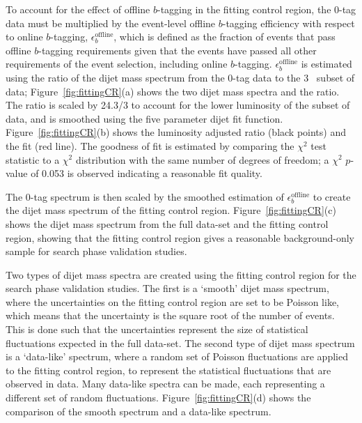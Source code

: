 To account for the effect of offline $b$-tagging in the fitting control region,
the 0-tag data must be multiplied by the event-level offline $b$-tagging efficiency with respect to online $b$-tagging, $\epsilon_b^{\text{offline}}$,
which is defined as the fraction of events that pass offline $b$-tagging requirements given
that the events have passed all other requirements of the \lm{} event selection, including online $b$-tagging.
$\epsilon_b^{\text{offline}}$ is estimated using the ratio
of the dijet mass spectrum from the 0-tag data to the 3~\ifb{} subset of data;
Figure~\ref{fig:fittingCR}(a) shows the two dijet mass spectra and the ratio.
The ratio is scaled by 24.3/3 to account for the lower luminosity of the subset of data,
and is smoothed using the five parameter dijet fit function.
Figure~\ref{fig:fittingCR}(b) shows the luminosity adjusted ratio (black points) and the fit (red line).
The goodness of fit is estimated by comparing the $\chi^2$ test statistic to a $\chi^2$ distribution with the same number of degrees of freedom;
a $\chi^2$ $p$-value of 0.053 is observed indicating a reasonable fit quality.

The 0-tag spectrum is then scaled by the smoothed estimation of $\epsilon_b^{\text{offline}}$ to create the dijet mass spectrum of the fitting control region.
Figure~\ref{fig:fittingCR}(c) shows the dijet mass spectrum from the full \lm{} data-set and the fitting control region,
showing that the fitting control region gives a reasonable background-only sample for search phase validation studies.

Two types of dijet mass spectra are created using the fitting control region for the search phase validation studies.
The first is a `smooth' dijet mass spectrum, where the uncertainties on the fitting control region are set to be Poisson like,
which means that the uncertainty is the square root of the number of events.
This is done such that the uncertainties represent the size of statistical fluctuations expected in the full \lm{} data-set.
The second type of dijet mass spectrum is a `data-like' spectrum,
where a random set of Poisson fluctuations are applied to the fitting control region,
to represent the statistical fluctuations that are observed in data.
Many data-like spectra can be made, each representing a different set of random fluctuations.
Figure~\ref{fig:fittingCR}(d) shows the comparison of the smooth spectrum and a data-like spectrum.

